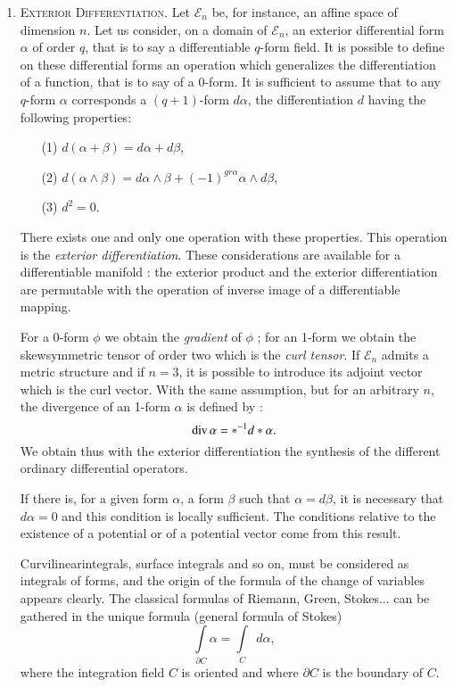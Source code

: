 \begin{enumerate}
\item \textsc{Exterior Differentiation.} Let $\mathscr{E}_n$ be, for
  instance, an affine space of dimension $n$. Let us consider, on a
  domain of $\mathscr{E}_n$, an exterior differential form $\alpha$ of
  order $q$, that is to say a differentiable $q$-form field. It is
  possible to define on these differential forms an operation which
  generalizes the differentiation of a function, that is to say of a
  0-form. It is sufficient to assume that to any $q$-form $\alpha$
  corresponds a $(q+1)$-form $d\alpha$, the differentiation $d$ having
  the following properties:
\begin{itemize}
\item[(1)] $d (\alpha + \beta) = d\alpha + d \beta$,
\item[(2)] $d(\alpha \wedge \beta) = d \alpha \wedge \beta + (-1)^{g
  r\alpha} \alpha \wedge d \beta$,
\item[(3)] $d^2 = 0$.
\end{itemize}
There exists one and only one operation with these properties. This
operation is the \textit{exterior differentiation}. These
considerations are available for a differentiable manifold : the
exterior product and the exterior differentiation are permutable with
the operation of inverse image of a differentiable mapping.

For a 0-form $\phi$ we obtain the \textit{gradient} of $\phi$ ; for an
1-form we obtain the skewsymmetric tensor of order two which is the
\textit{curl tensor}. If $\mathscr{E}_n$ admits a metric structure and
if $n =3$, it is possible to introduce its adjoint vector which is the
curl vector. With the same assumption, but for an arbitrary $n$, the
divergence of an 1-form $\alpha$ is defined by :
$$
\operatorname{div} \alpha = \ast^{-1} d \ast \alpha .
$$
We obtain thus with the exterior differentiation the synthesis of the
different ordinary differential operators. 

If there is, for a given form $\alpha$, a form $\beta$ such that
$\alpha = d \beta$, it is necessary that $d \alpha =0$ and this
condition is locally sufficient. The conditions relative to the
existence of a potential or of a potential vector come from this result.

Curvilinear\pageoriginale integrals, surface integrals and so on, must
be considered as integrals of forms, and the origin of the formula of
the change of variables appears clearly. The classical formulas of
Riemann, Green, Stokes... can be gathered in the unique formula
(general formula of Stokes)
$$
\int\limits_{\partial C} \alpha = \int\limits_{C} ~~ d \alpha, 
$$
where the integration field $C$ is oriented and where $\partial C$ is
the boundary of $C$.


\end{enumerate}
